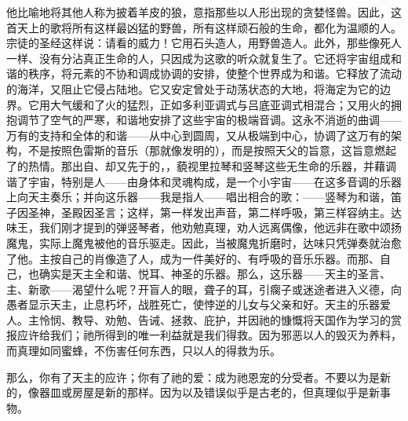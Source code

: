 他比喻地将其他人称为披着羊皮的狼，意指那些以人形出现的贪婪怪兽。因此，这首天上的歌将所有这样最凶猛的野兽，所有这样顽石般的生命，都化为温顺的人。宗徒的圣经这样说：请看的威力！它用石头造人，用野兽造人。此外，那些像死人一样、没有分沾真正生命的人，只因成为这歌的听众就复生了。它还将宇宙组成和谐的秩序，将元素的不协和调成协调的安排，使整个世界成为和谐。它释放了流动的海洋，又阻止它侵占陆地。它又安定曾处于动荡状态的大地，将海定为它的边界。它用大气缓和了火的猛烈，正如多利亚调式与吕底亚调式相混合；又用火的拥抱调节了空气的严寒，和谐地安排了这些宇宙的极端音调。这永不消逝的曲调——万有的支持和全体的和谐——从中心到圆周，又从极端到中心，协调了这万有的架构，不是按照色雷斯的音乐（那就像发明的），而是按照天父的旨意，这旨意燃起了的热情。那出自、却又先于的，，藐视里拉琴和竖琴这些无生命的乐器，并藉调谐了宇宙，特别是人——由身体和灵魂构成，是一个小宇宙——在这多音调的乐器上向天主奏乐；并向这乐器——我是指人——唱出相合的歌：——竖琴为和谐，笛子因圣神，圣殿因圣言；这样，第一样发出声音，第二样呼吸，第三样容纳主。达味王，我们刚才提到的弹竖琴者，他劝勉真理，劝人远离偶像，他远非在歌中颂扬魔鬼，实际上魔鬼被他的音乐驱走。因此，当被魔鬼折磨时，达味只凭弹奏就治愈了他。主按自己的肖像造了人，成为一件美好的、有呼吸的音乐乐器。而那、自己，也确实是天主全和谐、悦耳、神圣的乐器。那么，这乐器——天主的圣言、主、新歌——渴望什么呢？开盲人的眼，聋子的耳，引瘸子或迷途者进入义德，向愚者显示天主，止息朽坏，战胜死亡，使悖逆的儿女与父亲和好。天主的乐器爱人。主怜悯、教导、劝勉、告诫、拯救、庇护，并因祂的慷慨将天国作为学习的赏报应许给我们；祂所得到的唯一利益就是我们得救。因为邪恶以人的毁灭为养料，而真理如同蜜蜂，不伤害任何东西，只以人的得救为乐。\par

那么，你有了天主的应许；你有了祂的爱：成为祂恩宠的分受者。不要以为是新的，像器皿或房屋是新的那样。因为以及错误似乎是古老的，但真理似乎是新事物。\par

